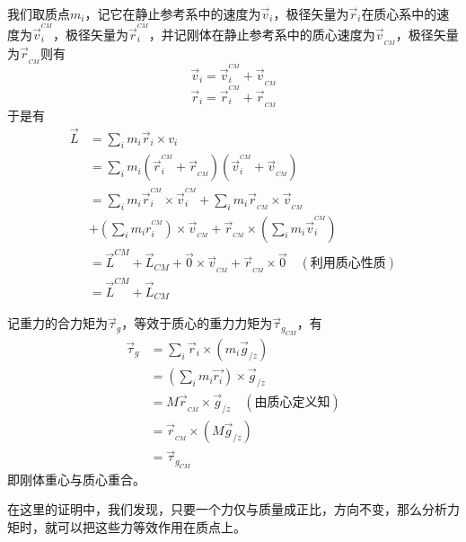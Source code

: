 \begin{prove}[$\vec{L}=\vec{L}_{CM}+\vec{L}^{CM}$]
    我们取质点$m_i$，记它在静止参考系中的速度为$\vec{v}_i$，极径矢量为$\vec{r}_i$在质心系中的速度为$\vec{v}^{^{CM}}_i$，极径矢量为$\vec{r}_i^{^{CM}}$，并记刚体在静止参考系中的质心速度为$\vec{v}_{_{CM}}$，极径矢量为$\vec{r}_{_{CM}}$则有
    \[\vec{v}_i=\vec{v}_i^{^{CM}}+\vec{v}_{_{CM}}\]
    \[\vec{r}_i=\vec{r}_i^{^{CM}}+\vec{r}_{_{CM}}\]
    于是有
    \begin{align*}
        \vec{L} & =\sum_im_i\vec{r}_i\times v_i                                                                            \\
                & =\sum_im_i(\vec{r}_i^{^{CM}}+\vec{r}_{_{CM}})(\vec{v}_i^{^{CM}}+\vec{v}_{_{CM}})                         \\
                & =\sum_im_i\vec{r}_i^{^{CM}}\times\vec{v}_i^{^{CM}}+\sum_im_i\vec{r}_{_{CM}}\times\vec{v}_{_{CM}}         \\
                & +(\sum_im_ir_i^{^{CM}})\times\vec{v}_{_{CM}}+\vec{r}_{_{CM}}\times(\sum_im_i\vec{v}_i^{^{CM}})           \\
                & =\vec{L}^{CM}+\vec{L}_{CM}+\vec{0}\times\vec{v}_{_{CM}}+\vec{r}_{_{CM}}\times\vec{0}\quad(\text{利用质心性质}) \\
                & =\vec{L}^{CM}+\vec{L}_{CM}
    \end{align*}
\end{prove}
\begin{prove}
    记重力的合力矩为$\vec{\tau}_{g}$，等效于质心的重力力矩为$\vec{\tau}_{g_{CM}}$，有
    \begin{align*}
        \vec{\tau}_g & =\sum_i\vec{r}_i\times(m_i\vec{g}_{/z})                 \\
                     & =(\sum_im_i\vec{r_i})\times\vec{g}_{/z}                 \\
                     & =M\vec{r}_{_{CM}}\times\vec{g}_{/z}\quad(\text{由质心定义知}) \\
                     & =\vec{r}_{_{CM}}\times(M\vec{g}_{/z})                   \\
                     & =\vec{\tau}_{g_{CM}}
    \end{align*}
    即刚体重心与质心重合。

    在这里的证明中，我们发现，只要一个力仅与质量成正比，方向不变，那么分析力矩时，就可以把这些力等效作用在质点上。
\end{prove}
\newcommand{\base}[1]{\hat{\vec{#1}}}
